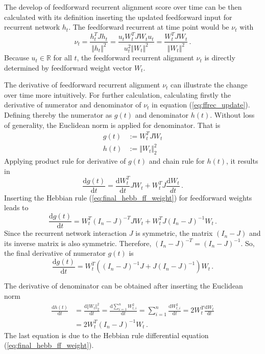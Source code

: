 \documentclass[11pt]{article}
\begin{document}
	The develop of feedforward recurrent alignment score over time can be then calculated with its definition inserting the updated feedforward input for recurrent network $h_t$. The feedforward recurrent at time point would be $\nu_t$ with
		\begin{equation} \label{eq:ffrec_update}
			\nu_t = \frac{h_t^T J h_t}{\Vert h_t \Vert ^2} = \frac{u_t W_t^T J W_t u_t}{u_t^2 \Vert W_t \Vert ^2} = \frac{W_t^T J W_t}{\Vert W_t \Vert^2}\, . 
		\end{equation}
	Because $u_t \in \mathbb{R}$ for all $t$, the feedforward recurrent alignment $\nu_t$ is directly determined by feedforward weight vector $W_t$.  
	
	The derivative of feedforward recurrent alignment $\nu_t$ can illustrate the change over time more intuitively. For further calculation, calculating firstly the derivative of numerator and denominator of $\nu_t$ in equation (\ref{eq:ffrec_update}). Defining thereby the numerator as $g(t)$ and denominator $h(t)$. Without loss of generality, the Euclidean norm is applied for denominator. That is
		\begin{subequations}
			\begin{align}
				g(t) &:= W_t^T J W_t\\
				h(t) &:= \Vert W_t \Vert_2^2
			\end{align}
		\end{subequations}
	Applying product rule for derivative of $g(t)$ and chain rule for $h(t)$, it results in
		\begin{equation}
				\frac{\mathrm{d}g(t)}{\mathrm{d}t} = \frac{\mathrm{d}W_t^T}{\mathrm{d}t} J W_t + W_t^T J \frac{\mathrm{d}W_t}{dt} \, .
		\end{equation}
	Inserting the Hebbian rule (\ref{eq:final_hebb_ff_weight}) for feedforward weights leads to
		\begin{equation}
			\frac{\mathrm{d}g(t)}{\mathrm{d}t} = W_t^T (I_n - J)^{-T}J W_t + W_t^T J(I_n - J)^{-1} W_t \, .
		\end{equation}
	Since the recurrent network interaction $J$ is symmetric, the matrix $(I_n-J)$ and its inverse matrix is also symmetric. Therefore, $(I_n - J)^{-T} = (I_n - J)^{-1}$. So, the final derivative of numerator $g(t)$ is
		\begin{equation}
			\frac{\mathrm{d}g(t)}{\mathrm{d}t} = W_t^T \left( (I_n - J)^{-1}J + J(I_n - J)^{-1}\right)W_t \, .
		\end{equation}
	
	The derivative of denominator can be obtained after inserting the Euclidean norm 
		\begin{equation}
			\begin{split}
				\frac{\mathrm{d}h(t)}{\mathrm{d}t} & = \frac{\mathrm{d} \Vert W_t \Vert_2^2}{\mathrm{d}t} = \frac{\mathrm{d} \sum_{i=1}^{n} W_{t, i}^2}{\mathrm{d}t}
				= \sum_{i=1}^{n} \frac{\mathrm{d}W_{t,i}^2}{\mathrm{d}t} = 2W_t^T \frac{\mathrm{d}W_t}{\mathrm{d}t} \\
				& = 2W_t^T (I_n - J)^{-1} W_t \,.
			\end{split}
		\end{equation}
	The last equation is due to the Hebbian rule differential equation (\ref{eq:final_hebb_ff_weight}). 
	
\end{document}
